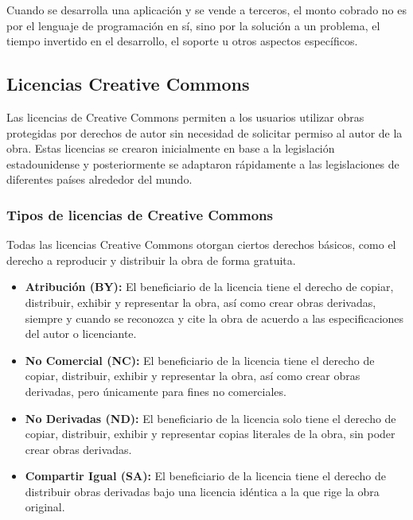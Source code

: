 Cuando se desarrolla una aplicación y se vende a terceros, el monto cobrado no es por el lenguaje de programación en sí, sino por la solución a un problema, el tiempo invertido en el desarrollo, el soporte u otros aspectos específicos.\par

	
		\subsection{Licencias Creative Commons}
		
			Las licencias de Creative Commons permiten a los usuarios utilizar obras protegidas por derechos de autor sin necesidad de solicitar permiso al autor de la obra. Estas licencias se crearon inicialmente en base a la legislación estadounidense y posteriormente se adaptaron rápidamente a las legislaciones de diferentes países alrededor del mundo.
			
			\subsubsection{Tipos de licencias de Creative Commons} 
				Todas las licencias Creative Commons otorgan ciertos derechos básicos, como el derecho a reproducir y distribuir la obra de forma gratuita.\par 
						\begin{itemize}
						
    						\item \textbf{Atribución (BY):} El beneficiario de la licencia tiene el derecho de copiar, distribuir, exhibir y representar la obra, así como crear obras derivadas, siempre y cuando se reconozca y cite la obra de acuerdo a las especificaciones del autor o licenciante.

    						\item \textbf{No Comercial (NC):} El beneficiario de la licencia tiene el derecho de copiar, distribuir, exhibir y representar la obra, así como crear obras derivadas, pero únicamente para fines no comerciales.

    						\item \textbf{No Derivadas (ND):} El beneficiario de la licencia solo tiene el derecho de copiar, distribuir, exhibir y representar copias literales de la obra, sin poder crear obras derivadas.

    						\item \textbf{Compartir Igual (SA):} El beneficiario de la licencia tiene el derecho de distribuir obras derivadas bajo una licencia idéntica a la que rige la obra original.				
				

					\end{itemize}
				
				
			
				